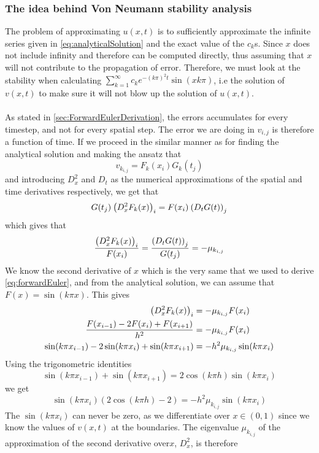 \documentclass[12pt,english,a4paper]{article}
\begin{document}
\subsubsection{The idea behind Von Neumann stability analysis}
The problem of approximating \(u(x,t)\) is to sufficiently approximate the infinite series given in \vref{eq:analyticalSolution} and the exact value of the \(c_k\)s. Since \( x\) does not include infinity and therefore can be computed directly, thus assuming that \(x\) will not contribute to the propagation of error. Therefore, we must look at the stability when calculating \( \sum_{k=1}^\infty c_ke^{-(k\pi)^2t}\sin(xk\pi) \), i.e the solution of \(v(x,t)\) to make sure it will not blow up the solution of \(u(x,t)\). \\ \\
As stated in \vref{sec:ForwardEulerDerivation}, the errors accumulates for every timestep, and not for every spatial step. The error we are doing in \(v_{i,j}\) is therefore a function of time.
If we proceed in the similar manner as for finding the analytical solution and making the ansatz that
\[
v_{k_{i,j}} = F_k(x_i)G_k(t_j)
\]
and introducing \(D_x^2\) and \(D_t\) as the numerical approximations of the spatial and time derivatives respectively, we get that
\[
G(t_j)\:\qty(D_x^2F_k(x))_i = F(x_i)\:\qty(D_tG(t))_j
\]
which gives that
\begin{equation}\label{eq:discreteRatios}
\frac{\qty(D_x^2F_k(x))_i }{ F(x_i)} = \frac{\qty(D_tG(t))_j}{G(t_j)} = -\mu_{k_{i,j}}
\end{equation}
We know the second derivative of \(x\) which is the very same that we used to derive \vref{eq:forwardEuler}, and from the analytical solution, we can assume that \(F(x) = \sin(k \pi x)\). This gives
\begin{align*}
\qty(D_x^2F_k(x))_i &= -\mu_{k_{i,j}}F(x_i) \\
\frac{F(x_{i-1}) -2F(x_i) + F(x_{i+1}) }{h^2} &= -\mu_{k_{i,j}}F(x_i) \\
\sin(k\pi x_{i-1}) -2\sin(k\pi x_i) + \sin(k \pi x_{i+1}) &= -h^2\mu_{k_{i,j}}\sin(k \pi x_i)
\end{align*}
Using the trigonometric identities
\[
\sin(k\pi x_{i-1}) + \sin(k\pi x_{i+1}) = 2\cos(k\pi h)\sin(k\pi x_i)
\]
we get
\[
\sin(k\pi x_i)(2\cos(k\pi h) - 2) = -h^2\mu_{k_{i,j}}\sin(k \pi x_i)
\]
The \(\sin(k\pi x_i) \) can never be zero, as we differentiate over \(x \in (0,1) \) since we know the values of \( v(x,t) \) at the boundaries. The eigenvalue \(\mu_{k_{i,j}}\) of the approximation of the second derivative over\(x \), \( D_x^2 \), is therefore
\end{document}
